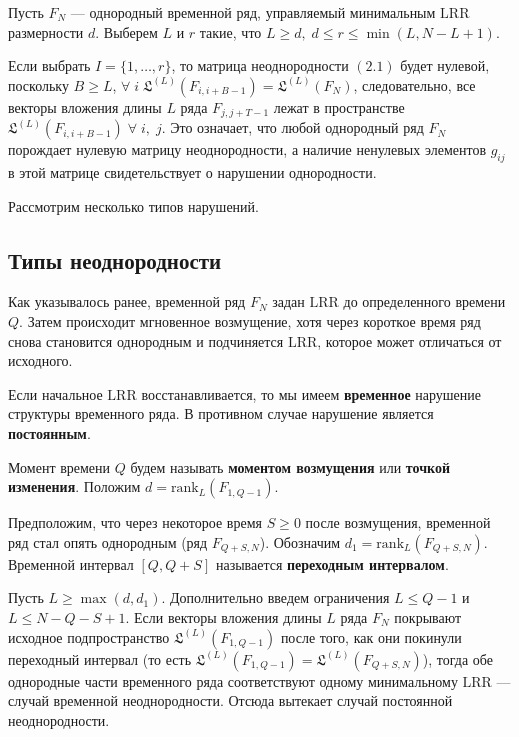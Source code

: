 \documentclass[specialist, substylefile = spbu.rtx,
			   subf, href, 12pt]{disser}
\begin{document}
Пусть $ F_N $ --- однородный временной ряд, управляемый минимальным $ \mathrm{LRR} $ размерности $ d $. Выберем $ L $ и $ r $ такие, что $ L \geq d, \; d \leq r \leq \min(L, N-L+1)$.

Если выбрать $ I = \{1, \dots, r\} $, то матрица неоднородности $ (2.1) $ будет нулевой, поскольку $ B \geq L $, $ \forall \; i \; \mathfrak{L}^{(L)}(F_{i, i+B-1}) = \mathfrak{L}^{(L)}(F_N) $, следовательно, все векторы вложения длины $ L $ ряда $ F_{j, j+T-1} $ лежат в пространстве $ \mathfrak{L}^{(L)}(F_{i, i+B-1}) \; \forall \; i,\; j $. Это означает, что любой однородный ряд $ F_N $ порождает нулевую матрицу неоднородности, а наличие ненулевых элементов $ g_{ij} $ в этой матрице свидетельствует о нарушении однородности.

Рассмотрим несколько типов нарушений.

\subsection{Типы неоднородности}

Как указывалось ранее, временной ряд $ F_N $ задан $ \mathrm{LRR} $ до определенного времени $ Q $. Затем происходит мгновенное возмущение, хотя через короткое время ряд снова становится однородным и подчиняется $ \mathrm{LRR} $, которое может отличаться от исходного.

Если начальное $ \mathrm{LRR} $ восстанавливается, то мы имеем \textbf{временное} нарушение \newline структуры временного ряда. В противном случае нарушение является \textbf{постоянным}.

Момент времени $ Q $ будем называть \textbf{моментом возмущения} или \textbf{точкой изменения}. Положим $ d = \mathrm{rank}_L(F_{1, Q-1}) $.

Предположим, что через некоторое время $ S \geq 0 $ после возмущения, временной ряд стал опять однородным (ряд $ F_{Q+S, N} $). Обозначим $ d_1 = \mathrm{rank}_L(F_{Q+S, N}) $. Временной интервал $ [Q, Q + S] $ называется \textbf{переходным интервалом}.

Пусть $ L \geq \max(d, d_1) $. Дополнительно введем ограничения $ L \leq Q-1 $ и $ L \leq N-Q-S+1 $. Если векторы вложения длины $ L $ ряда $ F_N $ покрывают исходное подпространство $ \mathfrak{L}^{(L)}(F_{1, Q-1}) $ после того, как они покинули переходный интервал (то есть  $ \mathfrak{L}^{(L)}(F_{1, Q-1}) = \mathfrak{L}^{(L)}(F_{Q+S, N})$), тогда обе однородные части временного ряда соответствуют одному минимальному $ \mathrm{LRR} $ --- случай временной неоднородности. Отсюда вытекает случай постоянной неоднородности.
\end{document}
